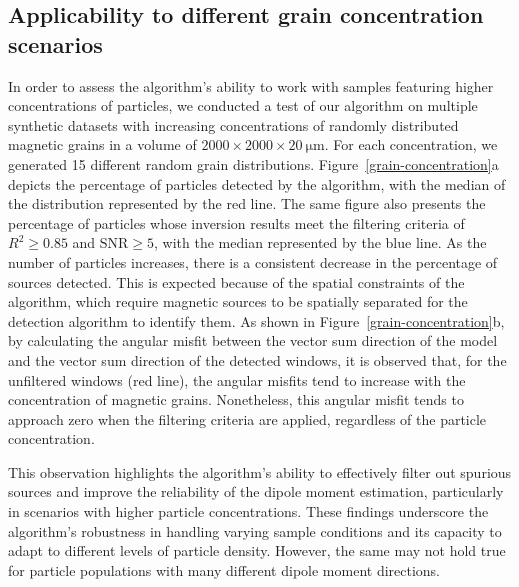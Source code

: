 \subsection{Applicability to different grain concentration scenarios}

In order to assess the algorithm's ability to work with samples featuring higher concentrations of particles, we conducted a test of our algorithm on multiple synthetic datasets with increasing concentrations of randomly distributed magnetic grains in a volume of $2000 \times 2000 \times \qty{20}{\um}$. For each concentration, we generated 15 different random grain distributions. Figure~\ref{grain-concentration}a depicts the percentage of particles detected by the algorithm, with the median of the distribution represented by the red line. The same figure also presents the percentage of particles whose inversion results meet the filtering criteria of $R^2 \geq 0.85$ and $\text{SNR} \geq 5$, with the median represented by the blue line. As the number of particles increases, there is a consistent decrease in the percentage of sources detected. This is expected because of the spatial constraints of the algorithm, which require magnetic sources to be spatially separated for the detection algorithm to identify them. As shown in Figure~\ref{grain-concentration}b, by calculating the angular misfit between the vector sum direction of the model and the vector sum direction of the detected windows, it is observed that, for the unfiltered windows (red line), the angular misfits tend to increase with the concentration of magnetic grains. Nonetheless, this angular misfit tends to approach zero when the filtering criteria are applied, regardless of the particle concentration.

This observation highlights the algorithm's ability to effectively filter out spurious sources and improve the reliability of the dipole moment estimation, particularly in scenarios with higher particle concentrations. These findings underscore the algorithm's robustness in handling varying sample conditions and its capacity to adapt to different levels of particle density. However, the same may not hold true for particle populations with many different dipole moment directions.

